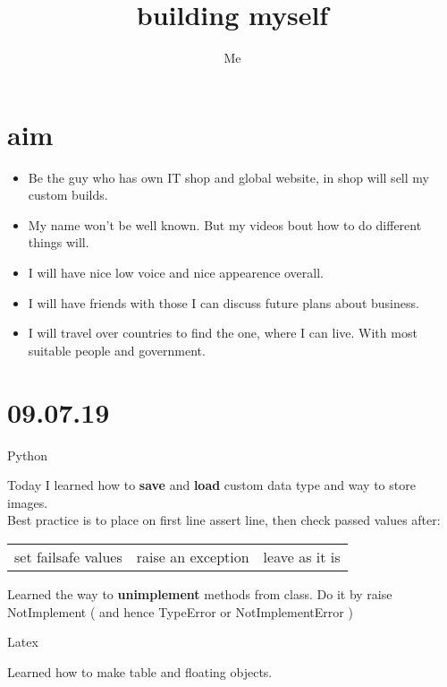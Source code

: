 \documentclass[12pt,a4paper,titlepage]{article}
\author{Me}
\title{building myself}
\begin{document}
\maketitle \tableofcontents
\newpage
\section{aim}
\begin{itemize}
  \item Be the guy who has own IT shop and global website, in shop will sell my
custom builds.
  \item My name won't be well known. But my videos bout how to do different
things will.
  \item I will have nice low voice and nice appearence overall.
  \item I will have friends with those I can discuss future plans about
business.
  \item I will travel over countries to find the one, where I can live. With
most suitable people and government.
\end{itemize}

\newpage
\section{09.07.19}
\begin{center}
    \large Python
\end{center}
Today I learned how to \textbf{save} and \textbf{load} custom data type and way to store images.\\
Best practice is to place on first line assert line, then check passed values after: 
\begin{center}
    \begin{tabular}[t]{c | c | c}
        set failsafe values & raise an exception & leave as it is
    \end{tabular}
\end{center}
Learned the way to \textbf{unimplement} methods from class. 
Do it by raise Not\-Imp\-lement ( and hence TypeError or NotImplementError ) 

\begin{center}
    \large Latex 
\end{center}
Learned how to make table and floating objects.


\newpage
\end{document}
